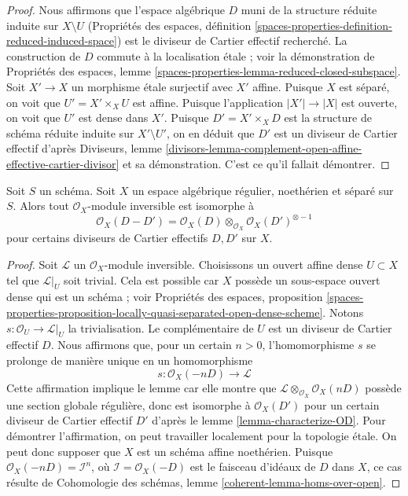 \begin{proof}
Nous affirmons que l'espace algébrique $D$ muni de la structure réduite induite
sur $X \setminus U$ (Propriétés des espaces, définition
\ref{spaces-properties-definition-reduced-induced-space})
est le diviseur de Cartier effectif recherché. La construction
de $D$ commute à la localisation \'etale ; voir la démonstration de
Propriétés des espaces, lemme
\ref{spaces-properties-lemma-reduced-closed-subspace}.
Soit $X' \to X$ un morphisme \'etale surjectif avec $X'$ affine.
Puisque $X$ est séparé, on voit que $U' = X' \times_X U$ est
affine. Puisque l'application $|X'| \to |X|$ est ouverte, on voit que $U'$
est dense dans $X'$. Puisque $D' = X' \times_X D$ est la structure de schéma
réduite induite sur $X' \setminus U'$, on en déduit que
$D'$ est un diviseur de Cartier effectif d'après
Diviseurs, lemme
\ref{divisors-lemma-complement-open-affine-effective-cartier-divisor}
et sa démonstration. C'est ce qu'il fallait démontrer.
\end{proof}

\begin{lemma}
\label{lemma-Noetherian-regular-separated-pic-effective-Cartier}
Soit $S$ un schéma. Soit $X$ un espace algébrique régulier, noethérien et séparé
sur $S$. Alors tout $\mathcal{O}_X$-module inversible est isomorphe à
$$
\mathcal{O}_X(D - D') =
\mathcal{O}_X(D) \otimes_{\mathcal{O}_X} \mathcal{O}_X(D')^{\otimes -1}
$$
pour certains diviseurs de Cartier effectifs $D, D'$ sur $X$.
\end{lemma}

\begin{proof}
Soit $\mathcal{L}$ un $\mathcal{O}_X$-module inversible.
Choisissons un ouvert affine dense $U \subset X$ tel que
$\mathcal{L}|_U$ soit trivial. Cela est possible car
$X$ possède un sous-espace ouvert dense qui est un schéma ; voir
Propriétés des espaces, proposition
\ref{spaces-properties-proposition-locally-quasi-separated-open-dense-scheme}.
Notons $s : \mathcal{O}_U \to \mathcal{L}|_U$ la trivialisation.
Le complémentaire de $U$ est un diviseur de Cartier effectif
$D$. Nous affirmons que, pour un certain $n > 0$, l'homomorphisme $s$ se prolonge de manière unique en un homomorphisme
$$
s : \mathcal{O}_X(-nD) \longrightarrow \mathcal{L}
$$
Cette affirmation implique le lemme car elle montre que
$\mathcal{L} \otimes_{\mathcal{O}_X} \mathcal{O}_X(nD)$
possède une section globale régulière, donc est isomorphe à
$\mathcal{O}_X(D')$ pour un certain diviseur de Cartier effectif $D'$
d'après le lemme \ref{lemma-characterize-OD}.
Pour démontrer l'affirmation, on peut travailler localement pour la topologie \'etale. On peut donc supposer que
$X$ est un schéma affine noethérien. Puisque
$\mathcal{O}_X(-nD) = \mathcal{I}^n$, où $\mathcal{I} = \mathcal{O}_X(-D)$
est le faisceau d'idéaux de $D$ dans $X$, ce cas résulte de
Cohomologie des schémas, lemme \ref{coherent-lemma-homs-over-open}.
\end{proof}

